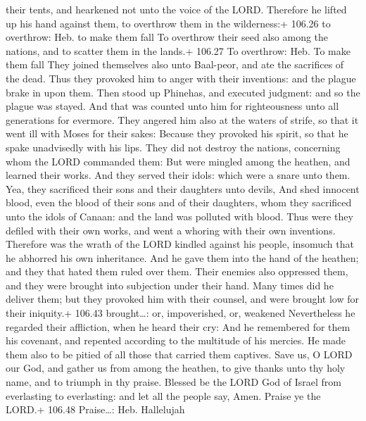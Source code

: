 their tents, and hearkened not unto the voice of the LORD. 
Therefore he lifted up his hand against them, to overthrow them in the
wilderness:+ 106.26 to overthrow: Heb. to make them fall 
To overthrow their seed also among the nations, and to scatter them in
the lands.+ 106.27 To overthrow: Heb. To make them fall 
They joined themselves also unto Baal-peor, and ate the sacrifices of
the dead.  Thus they provoked him to anger with their
inventions: and the plague brake in upon them.  Then stood
up Phinehas, and executed judgment: and so the plague was stayed.
 And that was counted unto him for righteousness unto all
generations for evermore.  They angered him also at the
waters of strife, so that it went ill with Moses for their sakes:
 Because they provoked his spirit, so that he spake
unadvisedly with his lips.  They did not destroy the
nations, concerning whom the LORD commanded them:  But were
mingled among the heathen, and learned their works.  And
they served their idols: which were a snare unto them. 
Yea, they sacrificed their sons and their daughters unto devils,
 And shed innocent blood, even the blood of their sons and
of their daughters, whom they sacrificed unto the idols of Canaan: and
the land was polluted with blood.  Thus were they defiled
with their own works, and went a whoring with their own inventions.
 Therefore was the wrath of the LORD kindled against his
people, insomuch that he abhorred his own inheritance.  And
he gave them into the hand of the heathen; and they that hated them
ruled over them.  Their enemies also oppressed them, and
they were brought into subjection under their hand.  Many
times did he deliver them; but they provoked him with their counsel, and
were brought low for their iniquity.+ 106.43 brought\ldots: or,
impoverished, or, weakened  Nevertheless he regarded their
affliction, when he heard their cry:  And he remembered for
them his covenant, and repented according to the multitude of his
mercies.  He made them also to be pitied of all those that
carried them captives.  Save us, O LORD our God, and gather
us from among the heathen, to give thanks unto thy holy name, and to
triumph in thy praise.  Blessed be the LORD God of Israel
from everlasting to everlasting: and let all the people say, Amen.
Praise ye the LORD.+ 106.48 Praise\ldots: Heb. Hallelujah


